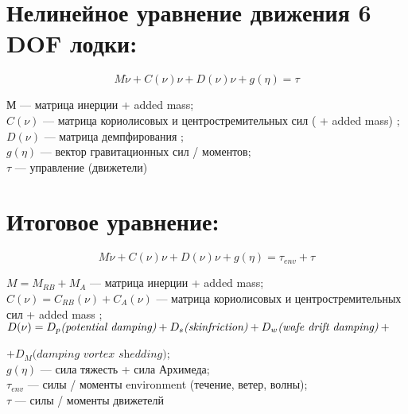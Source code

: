 \section*{Нелинейное уравнение движения 6 DOF лодки:}

\begin{equation*}
    M \Dot{{\nu}} + C({\nu}){\nu} + D({\nu}){\nu} + g({\eta}) = \tau
\end{equation*}

М --- матрица инерции + added mass; \\

${C({\nu})}$ --- матрица кориолисовых и центростремительных сил ( + added mass) ; \\

${D({\nu})}$ --- матрица демпфирования ; \\

${g({\eta})}$ --- вектор гравитационных сил / моментов; \\

${ \tau}$ --- управление (движетели) 


\section*{Итоговое уравнение:}

\begin{equation*}
    M \Dot{{\nu}} + C({\nu}){\nu} + D({\nu}){\nu} + g({\eta}) = \tau_{env} + \tau
\end{equation*}

${M = M_{RB} + M_A}$ --- матрица инерции + added mass; \\

${C({\nu}) = C_{RB}({\nu}) + C_A({\nu})      }$ --- матрица кориолисовых и центростремительных сил + added mass ; \\

${D({\nu}) = D_p \textit{(potential damping)} + D_s \textit{(skinfriction)} + D_w \textit{(wafe drift damping)} + \\}$

${+ D_M \textit{(damping vortex shedding)}      }$; \\

${g({\eta})}$ --- сила тяжесть + сила Архимеда; \\

${ \tau_{env}}$ --- силы / моменты environment (течение, ветер, волны); \\

${ \tau}$ --- силы / моменты движетелй